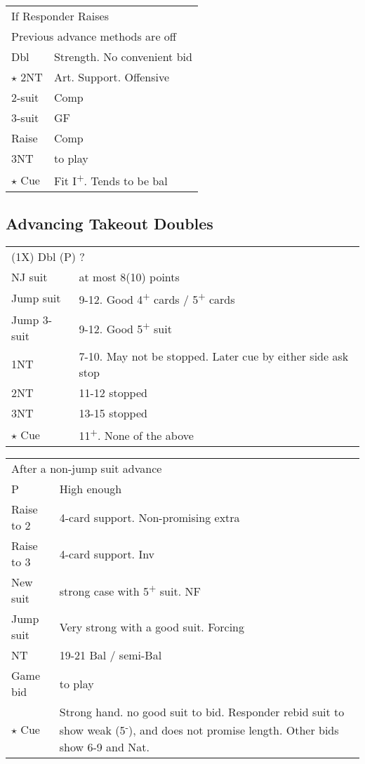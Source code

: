 \documentclass{article}
\newcommand{\nt}{\relsize{-1}NT\relsize{1}}
\newcommand{\up}{\textsuperscript{+}}
\newcommand{\down}{\textsuperscript{-}}
\newcommand{\al}{$\star$ }
\begin{document}
\medskip

\begin{tabular}{|l|p{6.5cm}}
	\multicolumn{2}{l}{If Responder Raises} \\
	\multicolumn{2}{l}{Previous advance methods are off} \\
	Dbl & Strength. No convenient bid \\
	\al{}2\nt{} & Art. Support. Offensive \\
	2-suit & Comp \\
	3-suit & GF \\
	Raise & Comp \\
	3\nt{} & to play \\
	\al{}Cue & Fit I\up{}. Tends to be bal \\
\end{tabular}

\subsection{Advancing Takeout Doubles}
\begin{tabular}{|l|p{6.5cm}}
	\multicolumn{2}{l}{(1X) Dbl (P) ?} \\
  NJ suit & at most 8(10) points \\
	Jump suit & 9-12. Good 4\up{} cards / 5\up{} cards \\
	Jump 3-suit & 9-12. Good 5\up{} suit \\
	1\nt{} & 7-10. May not be stopped. Later cue by either side ask stop \\
	2\nt{} & 11-12 stopped \\
	3\nt{} & 13-15 stopped \\
	\al{}Cue & 11\up{}. None of the above \\
\end{tabular}

\medskip

\begin{tabular}{|l|p{6.5cm}}
	\multicolumn{2}{l}{After a non-jump suit advance} \\
  P & High enough \\
	Raise to 2 & 4-card support. Non-promising extra \\
	Raise to 3 & 4-card support. Inv \\
	New suit & strong case with 5\up{} suit. NF \\
	Jump suit & Very strong with a good suit. Forcing \\
	\nt{} & 19-21 Bal / semi-Bal \\
	Game bid & to play \\
	\al{}Cue & Strong hand. no good suit to bid. Responder rebid suit to show weak (5\down{}), and does not promise length. Other bids show 6-9 and Nat. \\
\end{tabular}
\end{document}
